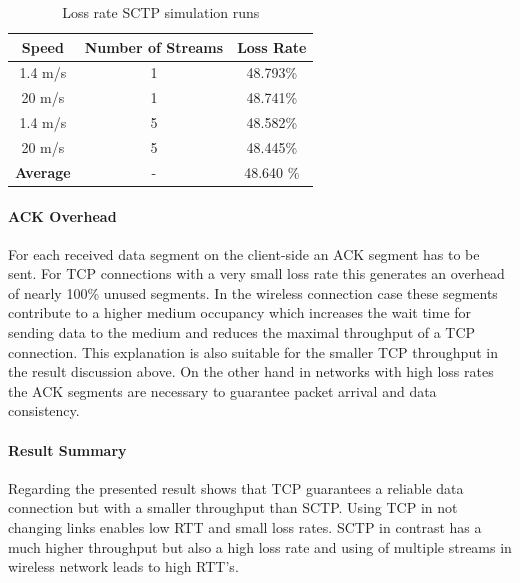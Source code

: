 \documentclass[a4paper]{article}
\begin{document}
\begin{table}[H]
\centering
\begin{tabular}{ccc}

\textbf{Speed} & \textbf{Number of Streams}  & \textbf{Loss Rate} \\ 
\hline 
\hline
1.4 m/s & 1 & 48.793\% \\ 
20 m/s  & 1 & 48.741\% \\ 
\hline
1.4 m/s & 5 & 48.582\% \\
20 m/s  & 5 & 48.445\% \\
 \hline
\textbf{Average} & - & 48.640 \%\\ 
\end{tabular} 
\caption{Loss rate SCTP simulation runs}
\label{table:loss-rate-sctp}
\end{table}

\paragraph{ACK Overhead}

For each received data segment on the client-side an ACK segment has to be sent. For TCP connections with a very small loss rate this generates an overhead of nearly 100\% unused segments. In the wireless connection case these segments contribute to a higher medium occupancy which increases the wait time for sending data to the medium and reduces the maximal throughput of a TCP connection. This explanation is also suitable for the smaller TCP throughput in the result discussion above. On the other hand in networks with high loss rates the ACK segments are necessary to guarantee packet arrival and data consistency. 


\paragraph{Result Summary}

Regarding the presented result shows that TCP guarantees a reliable data connection but with a smaller throughput than SCTP. Using TCP in not changing links enables low RTT and small loss rates. SCTP in contrast has a much higher throughput but also a high loss rate and using of multiple streams in wireless network leads to high RTT's.
\end{document}
